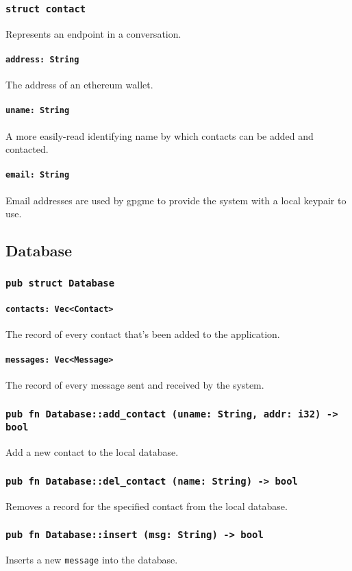 \documentclass[]{article}
\begin{document}
\subsubsection{\texttt{struct contact}}
Represents an endpoint in a conversation.
\paragraph{\texttt{address: String}}
The address of an ethereum wallet.
\paragraph{\texttt{uname: String}}
A more easily-read identifying name by which contacts can be added and contacted.
\paragraph{\texttt{email: String}}
Email addresses are used by gpgme to provide the system with a local keypair to use.

\subsection{Database}
\subsubsection{\texttt{pub struct Database}}
\paragraph{\texttt{contacts: Vec<Contact>}} The record of every contact that's been added to the application. 
\paragraph{\texttt{messages: Vec<Message>}} The record of every message sent and received by the system.
\subsubsection{\texttt{pub fn Database::add\_contact (uname: String, addr: i32) -> bool}}
Add a new contact to the local database.
\subsubsection{\texttt{pub fn Database::del\_contact (name: String) -> bool}}
Removes a record for the specified contact from the local database.
\subsubsection{\texttt{pub fn Database::insert (msg: String) -> bool}}
Inserts a new \verb!message! into the database.
\end{document}
